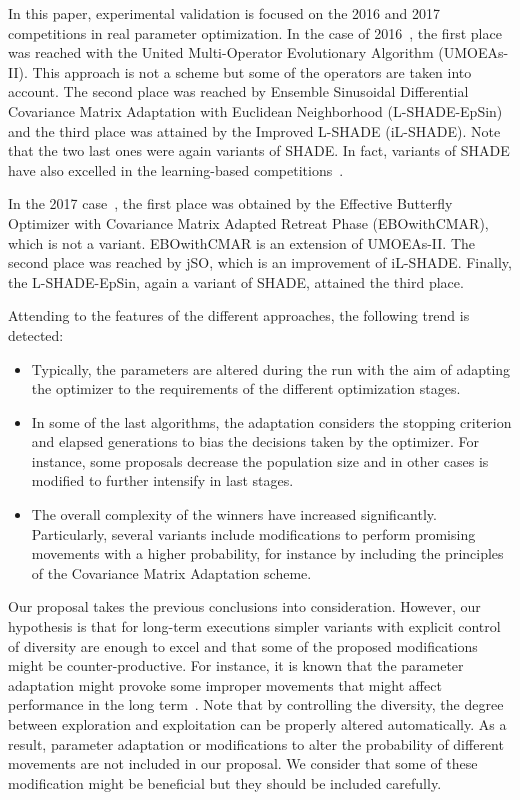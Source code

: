 In this paper, experimental validation is focused on the \CEC{} 2016 and \CEC{} 2017 competitions in real parameter optimization.
%
In the case of 2016~\cite{CEC2015}, the first place was reached with the United Multi-Operator Evolutionary Algorithm (UMOEAs-II).
%
This approach is not a \DE{} scheme but some of the \DE{} operators are taken into account.
%
The second place was reached by Ensemble Sinusoidal Differential Covariance Matrix Adaptation with Euclidean Neighborhood (L-SHADE-EpSin) 
and the third place was attained by the Improved L-SHADE (iL-SHADE).
%
Note that the two last ones were again variants of SHADE.
%
In fact, variants of SHADE have also excelled in the learning-based competitions~\cite{CEC2016_learn}.

In the \CEC{} 2017 case~\cite{CEC2017}, the first place was obtained by the Effective Butterfly Optimizer with Covariance 
Matrix Adapted Retreat Phase (EBOwithCMAR), which is not a \DE{} variant.
%
EBOwithCMAR is an extension of UMOEAs-II.
%
The second place was reached by jSO, which is an improvement of iL-SHADE.
%
Finally, the L-SHADE-EpSin, again a variant of SHADE, attained the third place.

Attending to the features of the different approaches, the following trend is detected:

\begin{itemize}
	\item Typically, the parameters are altered during the run with the aim of adapting the optimizer to the requirements of the different optimization stages. 
	\item In some of the last algorithms, the adaptation considers the stopping criterion and elapsed generations to bias the decisions taken by the optimizer.
	For instance, some proposals decrease the population size and in other cases \DE{} is modified to further intensify in last stages.
	\item The overall complexity of the winners have increased significantly. Particularly, several variants include modifications to perform promising
	movements with a higher probability, for instance by including the principles of the Covariance Matrix Adaptation scheme.
\end{itemize}

Our proposal takes the previous conclusions into consideration.
%
However, our hypothesis is that for long-term executions simpler variants with explicit control of diversity are enough to excel and 
that some of the proposed modifications might be counter-productive.
%
For instance, it is known that the parameter adaptation might provoke some improper movements that might affect performance in the
long term~\cite{montgomery2010analysis}.
%
Note that by controlling the diversity, the degree between exploration and exploitation can be properly altered automatically.
%
As a result, parameter adaptation or modifications to alter the probability of different movements are not included in our proposal.
%
We consider that some of these modification might be beneficial but they should be included carefully.


